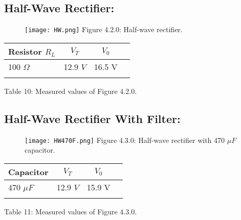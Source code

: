 \pagebreak

\subsection{Half-Wave Rectifier:}

\begin{figure}[H]
\texttt{[image: HW.png]}
\centering \linebreak \linebreak Figure 4.2.0: Half-wave rectifier.
\end{figure}

\begin{multicols}{2}
\begin{center}
\begin{tabular}[.5cm]{l c c c}
\toprule
Resistor $R_{L}$ & $V_{T}$ & $V_{0}$ \\
\midrule
100 $\Omega$ & 12.9 $V$ &  16.5 V \\
\bottomrule
\linebreak
\end{tabular}
\centering \linebreak Table 10: Measured values of Figure 4.2.0.
\end{center} \hfill

\end{multicols}

\pagebreak

\subsection{Half-Wave Rectifier With Filter:}

\begin{figure}[H]
\texttt{[image: HW470F.png]}
\centering \linebreak \linebreak Figure 4.3.0: Half-wave rectifier with 470 $\mu F$ capacitor.
\end{figure}

\begin{multicols}{2}
\begin{center}
\begin{tabular}[.5cm]{l c c c}
\toprule
Capacitor & $V_{T}$ & $V_{0}$ \\
\midrule
470 $\mu F$ & 12.9 $V$ &  15.9 V \\
\bottomrule
\linebreak
\end{tabular}
\centering \linebreak Table 11: Measured values of Figure 4.3.0.
\end{center} \hfill

\end{multicols}

